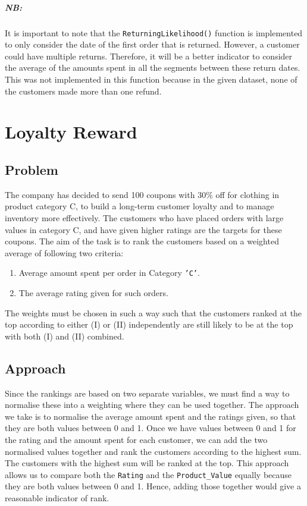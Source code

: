 \documentclass[11pt]{report}
\begin{document}
\paragraph{\textbf{NB:}} It is important to note that the \texttt{ReturningLikelihood()} function is implemented to only consider the date of the first order that is returned. However, a customer could have multiple returns. Therefore, it will be a better indicator to consider the average of the amounts spent in all the segments between these return dates. This was not implemented in this function because in the given dataset, none of the customers made more than one refund.

\chapter{Loyalty Reward}
\section*{Problem}
The company has decided to send 100 coupons with $30\%$ off for clothing in product category C, to build a long-term customer loyalty and to manage inventory more effectively. The customers who have placed orders with large values in category C, and have given higher ratings are the targets for these coupons. The aim of the task is to rank the customers based on a weighted average of following two criteria:

\begin{enumerate}[ {(}I{)} ]
	\item Average amount spent per order in Category \texttt{'C'}.
	\item The average rating given for such orders.
\end{enumerate}

The weights must be chosen in such a way such that the customers ranked at the top according to either (I) or (II) independently are still likely to be at the top with both (I) and (II) combined.

\section{Approach}
Since the rankings are based on two separate variables, we must find a way to normalise these into a weighting where they can be used together. The approach we take is to normalise the average amount spent and the ratings given, so that they are both values between 0 and 1. Once we have values between 0 and 1 for the rating and the amount spent for each customer, we can add the two normalised values together and rank the customers according to the highest sum. The customers with the highest sum will be ranked at the top. This approach allows us to compare both the \texttt{Rating} and the \texttt{Product\_Value} equally because they are both values between 0 and 1. Hence, adding those together would give a reasonable indicator of rank. \\
\end{document}
